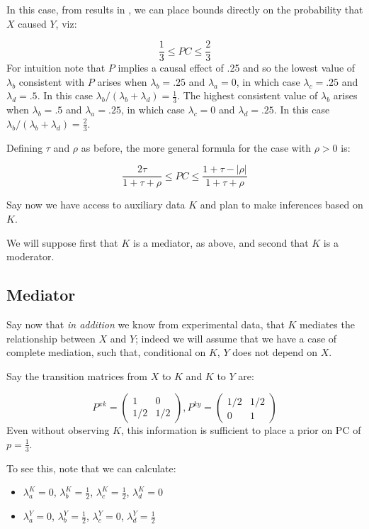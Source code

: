 \documentclass[12pt,]{book}
\providecommand{\tightlist}{%
  \setlength{\itemsep}{0pt}\setlength{\parskip}{0pt}}
\begin{document}
In this case, from results in \citet{dawid2017probability}, we can place bounds directly on the probability that \(X\) caused \(Y\), viz:

\[\frac13 \leq PC \leq \frac23 \]
For intuition note that \(P\) implies a causal effect of .25 and so the lowest value of \(\lambda_b\) consistent with \(P\) arises when \(\lambda_b = .25\) and \(\lambda_a = 0\), in which case \(\lambda_c = .25\) and \(\lambda_d = .5\). In this case \(\lambda_b/(\lambda_b+ \lambda_d)=\frac{1}{3}\). The highest consistent value of \(\lambda_b\) arises when \(\lambda_b = .5\) and \(\lambda_a = .25\), in which case \(\lambda_c = 0\) and \(\lambda_d = .25\). In this case \(\lambda_b/(\lambda_b+ \lambda_d)=\frac{2}{3}\).

Defining \(\tau\) and \(\rho\) as before, the more general formula for the case with \(\rho>0\) is:

\[\frac{2\tau}{1+\tau+\rho} \leq PC \leq \frac{1+\tau-|\rho|}{1+\tau+\rho} \]

Say now we have access to auxiliary data \(K\) and plan to make inferences based on \(K\).

We will suppose first that \(K\) is a mediator, as above, and second that \(K\) is a moderator.

\hypertarget{mediator}{%
\subsection{Mediator}\label{mediator}}

Say now that \emph{in addition} we know from experimental data, that \(K\) mediates the relationship between \(X\) and \(Y\); indeed we will assume that we have a case of complete mediation, such that, conditional on \(K\), \(Y\) does not depend on \(X\).

Say the transition matrices from \(X\) to \(K\) and \(K\) to \(Y\) are:

\[P^{xk}=\left( \begin{array}{cc} 1 & 0 \\ 1/2 & 1/2\end{array}\right), P^{ky}=\left( \begin{array}{cc} 1/2 & 1/2 \\ 0 & 1\end{array}\right)\]
Even without observing \(K\), this information is sufficient to place a prior on PC of \(p=\frac13\).

To see this, note that we can calculate:

\begin{itemize}
\tightlist
\item
  \(\lambda_a^K =0\), \(\lambda_b^K = \frac{1}{2}\), \(\lambda_c^K = \frac{1}{2}\), \(\lambda_d^K = 0\)
\item
  \(\lambda_a^Y =0\), \(\lambda_b^Y=\frac{1}{2}\), \(\lambda_c^Y=0\), \(\lambda_d^Y=\frac{1}{2}\)
\end{itemize}
\end{document}
